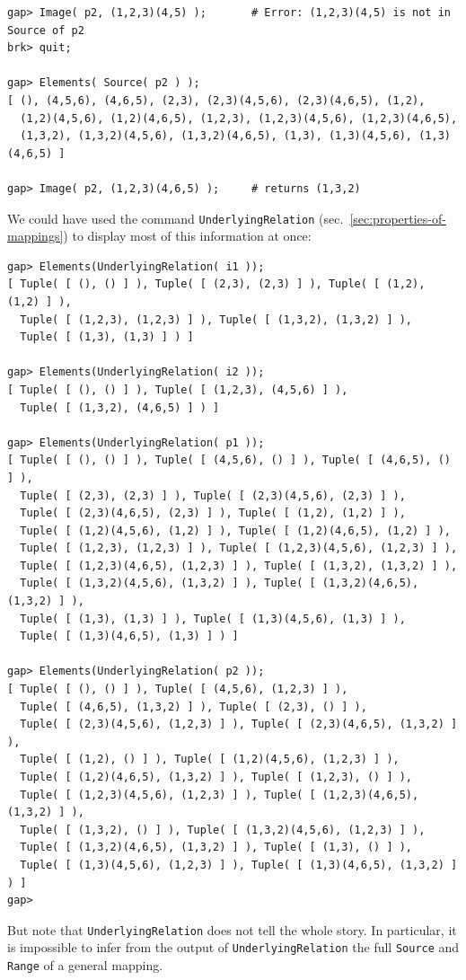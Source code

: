 \documentclass[11pt]{amsart}
\theoremstyle{plain}
\newcommand{\codesize}{\footnotesize}
\newcommand{\<}{\ensuremath{\langle}}
\renewcommand{\>}{\ensuremath{\rangle}}
\begin{document}
{\begin{verbatim}
gap> Image( p2, (1,2,3)(4,5) );       # Error: (1,2,3)(4,5) is not in Source of p2
brk> quit;                           

gap> Elements( Source( p2 ) );
[ (), (4,5,6), (4,6,5), (2,3), (2,3)(4,5,6), (2,3)(4,6,5), (1,2), 
  (1,2)(4,5,6), (1,2)(4,6,5), (1,2,3), (1,2,3)(4,5,6), (1,2,3)(4,6,5), 
  (1,3,2), (1,3,2)(4,5,6), (1,3,2)(4,6,5), (1,3), (1,3)(4,5,6), (1,3)(4,6,5) ]

gap> Image( p2, (1,2,3)(4,6,5) );     # returns (1,3,2)

\end{verbatim}}
\noindent We could have used the command {\tt UnderlyingRelation}
(sec.~\ref{sec:properties-of-mappings}) to display most of this information
at once: 
{\codesize
\begin{verbatim}
gap> Elements(UnderlyingRelation( i1 ));
[ Tuple( [ (), () ] ), Tuple( [ (2,3), (2,3) ] ), Tuple( [ (1,2), (1,2) ] ), 
  Tuple( [ (1,2,3), (1,2,3) ] ), Tuple( [ (1,3,2), (1,3,2) ] ), 
  Tuple( [ (1,3), (1,3) ] ) ]

gap> Elements(UnderlyingRelation( i2 ));
[ Tuple( [ (), () ] ), Tuple( [ (1,2,3), (4,5,6) ] ), 
  Tuple( [ (1,3,2), (4,6,5) ] ) ]

gap> Elements(UnderlyingRelation( p1 ));
[ Tuple( [ (), () ] ), Tuple( [ (4,5,6), () ] ), Tuple( [ (4,6,5), () ] ), 
  Tuple( [ (2,3), (2,3) ] ), Tuple( [ (2,3)(4,5,6), (2,3) ] ), 
  Tuple( [ (2,3)(4,6,5), (2,3) ] ), Tuple( [ (1,2), (1,2) ] ), 
  Tuple( [ (1,2)(4,5,6), (1,2) ] ), Tuple( [ (1,2)(4,6,5), (1,2) ] ), 
  Tuple( [ (1,2,3), (1,2,3) ] ), Tuple( [ (1,2,3)(4,5,6), (1,2,3) ] ), 
  Tuple( [ (1,2,3)(4,6,5), (1,2,3) ] ), Tuple( [ (1,3,2), (1,3,2) ] ), 
  Tuple( [ (1,3,2)(4,5,6), (1,3,2) ] ), Tuple( [ (1,3,2)(4,6,5), (1,3,2) ] ), 
  Tuple( [ (1,3), (1,3) ] ), Tuple( [ (1,3)(4,5,6), (1,3) ] ), 
  Tuple( [ (1,3)(4,6,5), (1,3) ] ) ]

gap> Elements(UnderlyingRelation( p2 ));
[ Tuple( [ (), () ] ), Tuple( [ (4,5,6), (1,2,3) ] ), 
  Tuple( [ (4,6,5), (1,3,2) ] ), Tuple( [ (2,3), () ] ), 
  Tuple( [ (2,3)(4,5,6), (1,2,3) ] ), Tuple( [ (2,3)(4,6,5), (1,3,2) ] ), 
  Tuple( [ (1,2), () ] ), Tuple( [ (1,2)(4,5,6), (1,2,3) ] ), 
  Tuple( [ (1,2)(4,6,5), (1,3,2) ] ), Tuple( [ (1,2,3), () ] ), 
  Tuple( [ (1,2,3)(4,5,6), (1,2,3) ] ), Tuple( [ (1,2,3)(4,6,5), (1,3,2) ] ), 
  Tuple( [ (1,3,2), () ] ), Tuple( [ (1,3,2)(4,5,6), (1,2,3) ] ), 
  Tuple( [ (1,3,2)(4,6,5), (1,3,2) ] ), Tuple( [ (1,3), () ] ), 
  Tuple( [ (1,3)(4,5,6), (1,2,3) ] ), Tuple( [ (1,3)(4,6,5), (1,3,2) ] ) ]
gap> 
\end{verbatim}}
But note that {\tt UnderlyingRelation} does not tell the whole story.  In particular,
it is impossible to infer from the output of {\tt UnderlyingRelation} the full 
{\tt Source} and {\tt Range} of a general mapping.
\\
\end{document}

